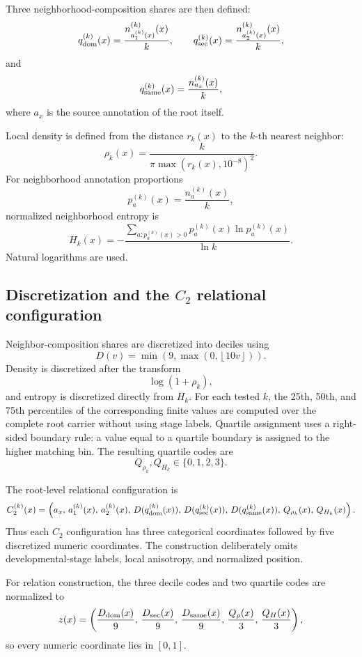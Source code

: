 \documentclass[11pt]{article}
\begin{document}
Three neighborhood-composition shares are then defined:
\[
q_{\rm dom}^{(k)}(x)
=
\frac{n_{a_1^{(k)}(x)}^{(k)}(x)}{k},
\qquad
q_{\rm sec}^{(k)}(x)
=
\frac{n_{a_2^{(k)}(x)}^{(k)}(x)}{k},
\]
and
\[
q_{\rm same}^{(k)}(x)
=
\frac{n_{a_x}^{(k)}(x)}{k},
\]
where \(a_x\) is the source annotation of the root itself.

Local density is defined from the distance \(r_k(x)\) to the \(k\)-th nearest neighbor:
\begin{equation}
\rho_k(x)
=
\frac{k}{\pi\max(r_k(x),10^{-8})^2}.
\label{eq:density}
\end{equation}
For neighborhood annotation proportions
\[
p_a^{(k)}(x)=\frac{n_a^{(k)}(x)}{k},
\]
normalized neighborhood entropy is
\begin{equation}
H_k(x)
=
-\frac{
\sum_{a:p_a^{(k)}(x)>0}
p_a^{(k)}(x)\ln p_a^{(k)}(x)
}{
\ln k
}.
\label{eq:entropy}
\end{equation}
Natural logarithms are used.

\subsection{Discretization and the \(C_2\) relational configuration}

Neighbor-composition shares are discretized into deciles using
\[
D(v)
=
\min\!\left(9,\max\!\left(0,\left\lfloor10v\right\rfloor\right)\right).
\]
Density is discretized after the transform
\[
\log(1+\rho_k),
\]
and entropy is discretized directly from \(H_k\). For each tested \(k\), the 25th, 50th, and 75th percentiles of the corresponding finite values are computed over the complete root carrier without using stage labels. Quartile assignment uses a right-sided boundary rule: a value equal to a quartile boundary is assigned to the higher matching bin. The resulting quartile codes are
\[
Q_{\rho_k},Q_{H_k}\in\{0,1,2,3\}.
\]

The root-level relational configuration is
\begin{equation}
C_2^{(k)}(x)
=
\left(
a_x,\,
a_1^{(k)}(x),\,
a_2^{(k)}(x),\,
D(q_{\rm dom}^{(k)}(x)),\,
D(q_{\rm sec}^{(k)}(x)),\,
D(q_{\rm same}^{(k)}(x)),\,
Q_{\rho_k}(x),\,
Q_{H_k}(x)
\right).
\label{eq:c2}
\end{equation}
Thus each \(C_2\) configuration has three categorical coordinates followed by five discretized numeric coordinates. The construction deliberately omits developmental-stage labels, local anisotropy, and normalized position.

For relation construction, the three decile codes and two quartile codes are normalized to
\begin{equation}
z(x)
=
\left(
\frac{D_{\rm dom}(x)}9,\,
\frac{D_{\rm sec}(x)}9,\,
\frac{D_{\rm same}(x)}9,\,
\frac{Q_\rho(x)}3,\,
\frac{Q_H(x)}3
\right),
\label{eq:numericvector}
\end{equation}
so every numeric coordinate lies in \([0,1]\).
\end{document}
